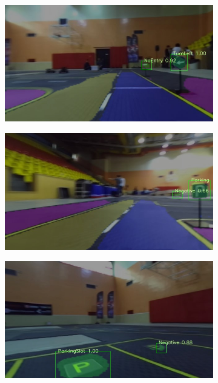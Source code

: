 \begin{figure}[h]
\begin{subfigure}[b]{0.45\linewidth}
    \includegraphics[width=\linewidth]{figures/experiments/real/noentry.jpg}
  \end{subfigure}
  \begin{subfigure}[b]{0.45\linewidth}
    \includegraphics[width=\linewidth]{figures/experiments/real/parking.jpg}
  \end{subfigure}
  \begin{subfigure}[b]{0.45\linewidth}
    \includegraphics[width=\linewidth]{figures/experiments/real/parkingslot.jpg}

\end{subfigure}
\end{figure}
